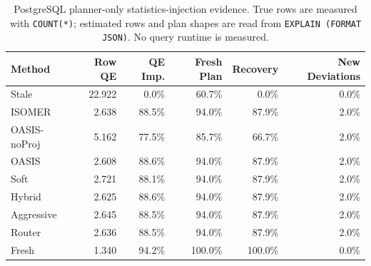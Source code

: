 \begin{table}[t]
  \centering
  \small
  \caption{PostgreSQL planner-only statistics-injection evidence. True rows are measured with \texttt{COUNT(*)}; estimated rows and plan shapes are read from \texttt{EXPLAIN (FORMAT JSON)}. No query runtime is measured.}
  \label{tab:postgres_planner_stats_injection}
  \setlength{\tabcolsep}{4pt}
  \begin{tabular}{lrrrrr}
    \toprule
    Method & Row QE & QE Imp. & Fresh Plan & Recovery & New Deviations \\
    \midrule
    Stale & 22.922 & 0.0\% & 60.7\% & 0.0\% & 0.0\% \\
    ISOMER & 2.638 & 88.5\% & 94.0\% & 87.9\% & 2.0\% \\
    OASIS-noProj & 5.162 & 77.5\% & 85.7\% & 66.7\% & 2.0\% \\
    OASIS & 2.608 & 88.6\% & 94.0\% & 87.9\% & 2.0\% \\
    Soft & 2.721 & 88.1\% & 94.0\% & 87.9\% & 2.0\% \\
    Hybrid & 2.625 & 88.6\% & 94.0\% & 87.9\% & 2.0\% \\
    Aggressive & 2.645 & 88.5\% & 94.0\% & 87.9\% & 2.0\% \\
    Router & 2.636 & 88.5\% & 94.0\% & 87.9\% & 2.0\% \\
    Fresh & 1.340 & 94.2\% & 100.0\% & 100.0\% & 0.0\% \\
    \bottomrule
  \end{tabular}
\end{table}
